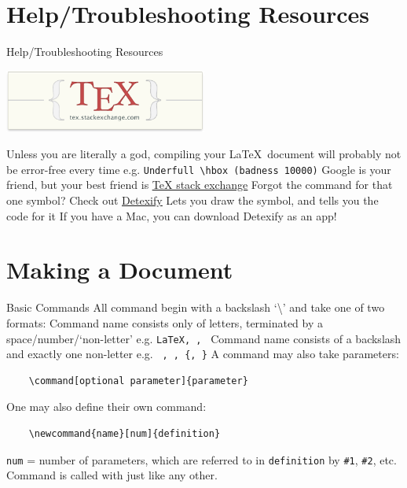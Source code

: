 \documentclass[10pt]{beamer}
\begin{document}
\section{Help/Troubleshooting Resources}
\begin{frame}{Help/Troubleshooting Resources}

	\begin{center}
	\includegraphics[width=0.5\textwidth]{./figures/texstackexchange.png}
	\end{center}

	\bi Unless you are literally a god, compiling your \LaTeX \, document will probably not be error-free every time
	\bi e.g. \texttt{Underfull \textbackslash hbox (badness 10000)} \ei \ei
	\bi Google is your friend, but your best friend is
	\bi \href{https://tex.stackexchange.com/}{\underline{TeX stack exchange}} \ei \ei
	\bi Forgot the command for that one symbol? Check out \href{http://detexify.kirelabs.org/classify.html}{\underline{Detexify}}
	\bi Lets you draw the symbol, and tells you the code for it \ei
	\bi If you have a Mac, you can download Detexify as an app! \ei \ei
	
\end{frame}
	
\section{Making a Document}
\begin{frame}[fragile]{Basic Commands}
	\bi All command begin with a backslash `\textbackslash{}' and take one of two formats:
		\bi Command name consists \alert{only of letters}, terminated by a space/number/`non-letter' 
		\bi e.g. \texttt{\LaTeX, \hfill, \newline} \ei \ei
		\bi Command name consists of a \alert{backslash and exactly one non-letter}
		\bi e.g. \texttt{\,, \;, \{, \}}\ei \ei \ei
	\bi A command may also take parameters: \ei
	\begin{verbatim}
	\command[optional parameter]{parameter}
	\end{verbatim}
	\bi One may also \alert{define their own command}:
	\begin{verbatim}
	\newcommand{name}[num]{definition}
	\end{verbatim}
	\bi \texttt{num} = number of parameters, which are referred to in \texttt{definition} by \texttt{\#1}, \texttt{\#2}, etc. Command is called with \texttt{\name} just like any other. \ei \ei
\end{frame}	
\end{document}
